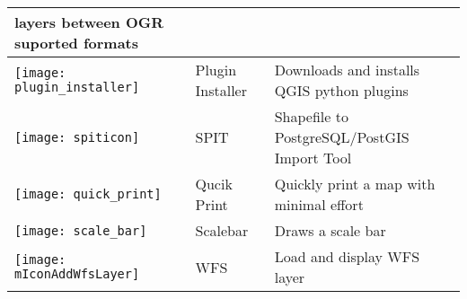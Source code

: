 \begin{minipage}{\textwidth}
\begin{table}[H]
\begin{tabular}{|l|l|p{4in}|}
layers between OGR suported formats\\
\hline
\texttt{[image: plugin\_installer]}
 & Plugin Installer \index{plugins!Plugin Installer} & Downloads and installs
QGIS python plugins\\
\hline
\texttt{[image: spiticon]}
 & SPIT \index{plugins!spit}& Shapefile to PostgreSQL/PostGIS Import Tool \\
\hline
\texttt{[image: quick\_print]}
 & Qucik Print \index{plugins!quick print}& Quickly print a map with minimal
effort \\
\hline
\texttt{[image: scale\_bar]}
 & Scalebar \index{plugins!scalebar}& Draws a scale bar\\
\hline
\texttt{[image: mIconAddWfsLayer]}
 & WFS & Load and display WFS layer \\
\hline
\end{tabular}
\end{table}
\end{minipage}

\normalsize

\begin{Tip}\caption{\textsc{Plugins Settings Saved to Project}}
\end{Tip}
